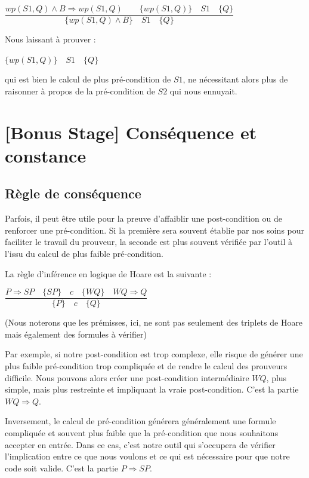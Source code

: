 \documentclass[12pt,francais,]{scrbook}
\begin{document}
\begin{center}
\(\dfrac{wp(S1,Q) \wedge B \Rightarrow wp(S1,Q)\quad\quad\{ wp(S1,Q) \} \quad S1 \quad \{Q\}}{\{ wp(S1,Q) \wedge B \} \quad S1 \quad \{Q\}}\)
\end{center}

Nous laissant à prouver :

\begin{center} \(\{ wp(S1,Q) \} \quad S1 \quad \{Q\}\) \end{center}

qui est bien le calcul de plus pré-condition de \(S1\), ne nécessitant
alors plus de raisonner à propos de la pré-condition de \(S2\) qui nous
ennuyait.

\section{{[}Bonus Stage{]} Conséquence et
constance}\label{bonus-stage-consuxe9quence-et-constance}

\subsection{Règle de conséquence}\label{ruxe8gle-de-consuxe9quence}

Parfois, il peut être utile pour la preuve d'affaiblir une
post-condition ou de renforcer une pré-condition. Si la première sera
souvent établie par nos soins pour faciliter le travail du prouveur, la
seconde est plus souvent vérifiée par l'outil à l'issu du calcul de plus
faible pré-condition.

La règle d'inférence en logique de Hoare est la suivante :

\begin{center}\(\dfrac{P \Rightarrow SP \quad \{SP\}\quad c\quad \{WQ\} \quad WQ \Rightarrow Q}{\{P\}\quad c \quad \{Q\}}\)\end{center}

(Nous noterons que les prémisses, ici, ne sont pas seulement des
triplets de Hoare mais également des formules à vérifier)

Par exemple, si notre post-condition est trop complexe, elle risque de
générer une plus faible pré-condition trop compliquée et de rendre le
calcul des prouveurs difficile. Nous pouvons alors créer une
post-condition intermédiaire \(WQ\), plus simple, mais plus restreinte
et impliquant la vraie post-condition. C'est la partie
\(WQ \Rightarrow Q\).

Inversement, le calcul de pré-condition générera généralement une
formule compliquée et souvent plus faible que la pré-condition que nous
souhaitons accepter en entrée. Dans ce cas, c'est notre outil qui
s'occupera de vérifier l'implication entre ce que nous voulons et ce qui
est nécessaire pour que notre code soit valide. C'est la partie
\(P \Rightarrow SP\).
\end{document}
